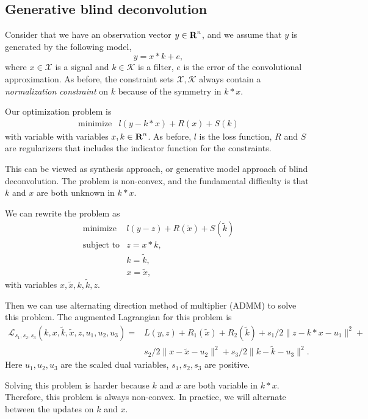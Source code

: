 \documentclass[12pt]{article}
\begin{document}
\subsection{Generative blind deconvolution }
Consider that we have an observation vector $y\in {\mbox{\bf R}}^n$, and we assume that $y$ is generated by the following model,
$$y=x*k + e,$$
where $x\in \mathcal X$ is a signal and $k\in \mathcal K$ is a filter, $e$ is the error of the convolutional approximation. 
As before, the constraint sets $\mathcal X, \mathcal K$ always contain 
a \emph{normalization constraint} on $k$ because of the symmetry in $k*x$. 

Our optimization problem is
\[
\begin{array}{ll}
\mbox{minimize}   & l(y-k*x)+R(x)+ S(k)
\end{array}
\]
with variable  with variables $x,k \in {\mbox{\bf R}}^n$. 
 As before, $l$ is the loss function, $R$
and $S$ are regularizers that includes the indicator function for the constraints. 

This can be viewed as synthesis approach, or generative model approach of blind deconvolution. 
The problem is non-convex, and the fundamental difficulty is that $k$ and $x$ are both unknown in $k*x$.

 We can rewrite the problem as
\[
\begin{array}{ll}
\mbox{minimize}   &  l(y-z)+R(\tilde{x})+ S(\tilde{k})  \\
\mbox{subject to}  & z = x*k,\\
& k = \tilde{k},\\
& x = \tilde{x},
\end{array}
\]
with variables $x, \tilde{x}, k, \tilde{k},z$.

Then we can use alternating direction method of multiplier (ADMM) to solve this problem. 
The augmented Lagrangian for this problem is 
\[
\begin{array}{ll}
 \mathcal{L}_{s_1, s_2,s_3}(k, x,\tilde{k},\tilde{x}, z, u_1, u_2, u_3)=&L(y,z)+R_1(\tilde{x})+ R_2(\tilde{k})
 + s_1/2 \| z -k*x -u_1\|^2 + \\
& s_2/2 \| x- \tilde{x}-u_2\|^2+s_3/2 \| k- \tilde{k}-u_3\|^2.
\end{array}
\]
Here $u_1, u_2, u_3$ are the scaled dual variables, $s_1, s_2, s_3$ are positive. 

Solving this problem is harder because $k$ and $x$ are both variable in $k*x$. 
Therefore, this problem is always non-convex. In practice, we will alternate between the updates on $k$ and $x$. 
\end{document}
